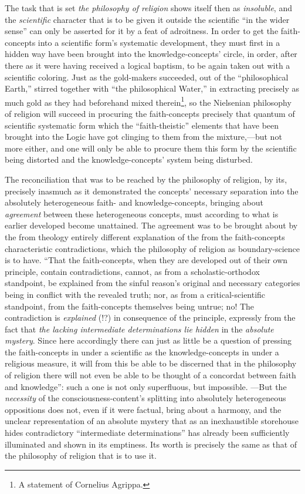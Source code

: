 \documentclass[12pt,a4paper]{book}
\begin{document}
The task that is set \emph{the philosophy of religion} shows itself then as \emph{insoluble}, and the \emph{scientific} character
that is to be given it outside the scientific ``in the wider sense'' can only be asserted for it by a feat of adroitness.
In order to get the faith-concepts into a scientific form's systematic development, they must first in a hidden way have
been brought into the knowledge-concepts' circle, in order, after there as it were having received a logical baptism, to
be again taken out with a scientific coloring. Just as the gold-makers succeeded, out of the ``philosophical Earth,''
stirred together with ``the philosophical Water,'' in extracting precisely as much gold as they had beforehand mixed
therein\footnote{A statement of Cornelius Agrippa.}, so the Nielsenian philosophy of religion will succeed in procuring
the faith-concepts precisely that quantum of scientific systematic form which the ``faith-theistic'' elements that have
been brought into the Logic have got clinging to them from the mixture,---but not more either, and one will only be able
to procure them this form by the scientific being distorted and the knowledge-concepts' system being disturbed.

The reconciliation that was to be reached by the philosophy of religion, by its, precisely inasmuch as it demonstrated
the concepts' necessary separation into the absolutely heterogeneous faith- and knowledge-concepts, bringing about
\emph{agreement} between these heterogeneous concepts, must according to what is earlier developed become unattained.
The agreement was to be brought about by the from theology entirely different explanation of the from the faith-concepts
characteristic contradictions, which the philosophy of religion as boundary-science is to have. ``That the faith-concepts,
when they are developed out of their own principle, contain contradictions, cannot, as from a scholastic-orthodox
standpoint, be explained from the sinful reason's original and necessary categories being in conflict with the revealed
truth; nor, as from a critical-scientific standpoint, from the faith-concepts themselves being untrue; no! The contradiction
is \emph{explained} (!?) in consequence of the principle, expressly from the fact that \emph{the lacking intermediate determinations
lie hidden} in the \emph{absolute mystery}. Since here accordingly there can just as little be a question of pressing the
faith-concepts in under a scientific as the knowledge-concepts in under a religious measure, it will from this be able to be
discerned that in the philosophy of religion there will not even be able to be thought of a concordat between faith and
knowledge'': such a one is not only superfluous, but impossible. ---But the \emph{necessity} of the consciousness-content's
splitting into absolutely heterogeneous oppositions does not, even if it were factual, bring about a harmony, and the
unclear representation of an absolute mystery that as an inexhaustible storehouse hides contradictory ``intermediate
determinations'' has already been sufficiently illuminated and shown in its emptiness. Its worth is precisely the same as
that of the philosophy of religion that is to use it.
\end{document}
